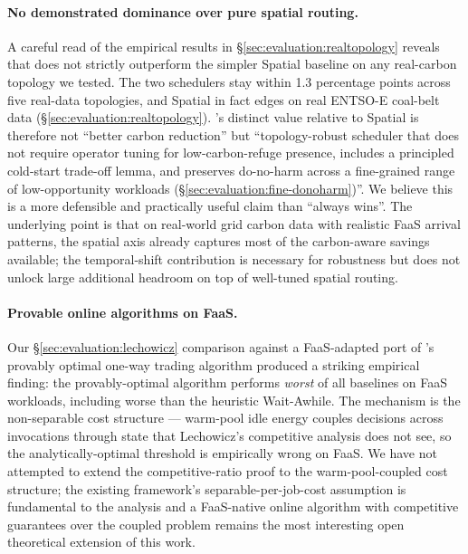 \paragraph{No demonstrated dominance over pure spatial routing.}
A careful read of the empirical results in
\S\ref{sec:evaluation:realtopology} reveals that \GreenFaaS{} does
not strictly outperform the simpler Spatial baseline on any
real-carbon topology we tested. The two schedulers stay within 1.3
percentage points across five real-data topologies, and Spatial in
fact edges \GreenFaaS{} on real ENTSO-E coal-belt data
(\S\ref{sec:evaluation:realtopology}). \GreenFaaS's distinct value
relative to Spatial is therefore not ``better carbon reduction'' but
``topology-robust scheduler that does not require operator tuning
for low-carbon-refuge presence, includes a principled cold-start
trade-off lemma, and preserves do-no-harm across a fine-grained
range of low-opportunity workloads
(\S\ref{sec:evaluation:fine-donoharm})''. We believe this is a more
defensible and practically useful claim than ``always wins''. The
underlying point is that on real-world grid carbon data with
realistic FaaS arrival patterns, the spatial axis already captures
most of the carbon-aware savings available; the temporal-shift
contribution is necessary for robustness but does not unlock large
additional headroom on top of well-tuned spatial routing.

\paragraph{Provable online algorithms on FaaS.} Our
\S\ref{sec:evaluation:lechowicz} comparison against a FaaS-adapted
port of \citet{lechowicz2024online}'s provably optimal one-way trading
algorithm produced a striking empirical finding: the provably-optimal
algorithm performs \emph{worst} of all baselines on FaaS workloads,
including worse than the heuristic Wait-Awhile. The mechanism is the
non-separable cost structure --- warm-pool idle energy couples
decisions across invocations through state that Lechowicz's
competitive analysis does not see, so the analytically-optimal
threshold is empirically wrong on FaaS. We have not attempted to
extend the competitive-ratio proof to the warm-pool-coupled cost
structure; the existing framework's separable-per-job-cost assumption
is fundamental to the analysis and a FaaS-native online algorithm
with competitive guarantees over the coupled problem remains the
most interesting open theoretical extension of this work.

